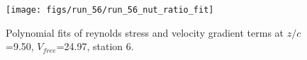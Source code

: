 \begin{figure}[H]
\centering
\texttt{[image: figs/run\_56/run\_56\_nut\_ratio\_fit]}
\caption{Polynomial fits of reynolds stress and velocity gradient terms at $z/c$=9.50, $V_{free}$=24.97, station 6.}
\label{fig:run_56_nut_ratio_fit}
\end{figure}


